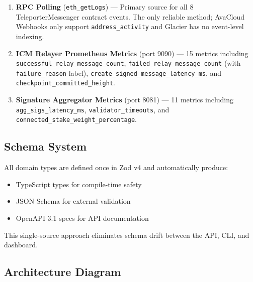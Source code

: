 \documentclass[11pt,a4paper]{article}
\begin{document}
\begin{metricbox}
\begin{enumerate}[label=\textcolor{avaxred}{\arabic*.}, nosep]
  \item \textbf{RPC Polling} (\texttt{eth\_getLogs}) --- Primary source for all 8 TeleporterMessenger contract events. The only reliable method; AvaCloud Webhooks only support \texttt{address\_activity} and Glacier has no event-level indexing.
  \item \textbf{ICM Relayer Prometheus Metrics} (port 9090) --- 15 metrics including \texttt{successful\_relay\_message\_count}, \texttt{failed\_relay\_message\_count} (with \texttt{failure\_reason} label), \texttt{create\_signed\_message\_latency\_ms}, and \texttt{checkpoint\_committed\_height}.
  \item \textbf{Signature Aggregator Metrics} (port 8081) --- 11 metrics including \texttt{agg\_sigs\_latency\_ms}, \texttt{validator\_timeouts}, and \texttt{connected\_stake\_weight\_percentage}.
\end{enumerate}
\end{metricbox}

\subsection{Schema System}

All domain types are defined once in Zod v4 and automatically produce:
\begin{itemize}
  \item TypeScript types for compile-time safety
  \item JSON Schema for external validation
  \item OpenAPI 3.1 specs for API documentation
\end{itemize}

This single-source approach eliminates schema drift between the API, CLI, and dashboard.

\subsection{Architecture Diagram}
\end{document}
